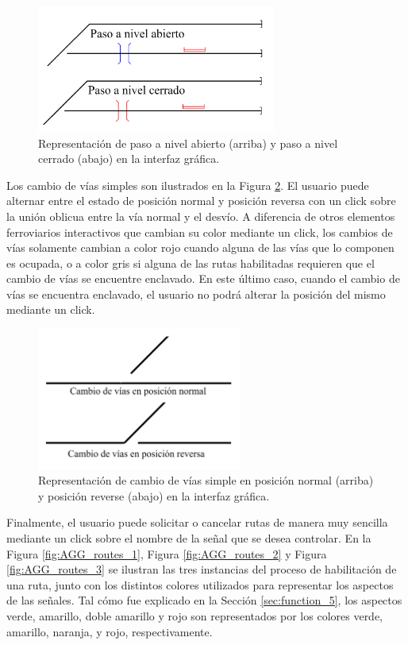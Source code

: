 	\begin{figure}[H]
		\centering
		\includegraphics[width=0.7\textwidth]{AGG/images/AGG_cruce}
		\centering\caption{Representación de paso a nivel abierto (arriba) y paso a nivel cerrado (abajo) en la interfaz gráfica.}
		\label{fig:AGG_levelCrossing}
	\end{figure}
	
	Los cambio de vías simples son ilustrados en la Figura \ref{fig:AGG_switch}. El usuario puede alternar entre el estado de posición normal y posición reversa con un click sobre la unión oblicua entre la vía normal y el desvío. A diferencia de otros elementos ferroviarios interactivos que cambian su color mediante un click, los cambios de vías solamente cambian a color rojo cuando alguna de las vías que lo componen es ocupada, o a color gris si alguna de las rutas habilitadas requieren que el cambio de vías se encuentre enclavado. En este último caso, cuando el cambio de vías se encuentra enclavado, el usuario no podrá alterar la posición del mismo mediante un click.
	
	\begin{figure}[H]
		\centering
		\includegraphics[width=0.6\textwidth]{AGG/images/AGG_switch}
		\centering\caption{Representación de cambio de vías simple en posición normal (arriba) y posición reverse (abajo) en la interfaz gráfica.}
		\label{fig:AGG_switch}
	\end{figure}

	Finalmente, el usuario puede solicitar o cancelar rutas de manera muy sencilla mediante un click sobre el nombre de la señal que se desea controlar. En la Figura \ref{fig:AGG_routes_1}, Figura \ref{fig:AGG_routes_2} y Figura \ref{fig:AGG_routes_3} se ilustran las tres instancias del proceso de habilitación de una ruta, junto con los distintos colores utilizados para representar los aspectos de las señales. Tal cómo fue explicado en la Sección \ref{sec:function_5}, los aspectos verde, amarillo, doble amarillo y rojo son representados por los colores verde, amarillo, naranja, y rojo, respectivamente.
	
